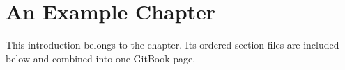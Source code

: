 \chapter{An Example Chapter}
\label{chap:example}

This introduction belongs to the chapter. Its ordered section files are included
below and combined into one GitBook page.



